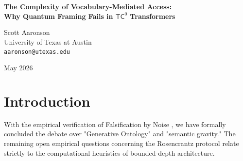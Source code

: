\documentclass[12pt,a4paper]{article}
\begin{document}
\begin{center}
    {\LARGE\bfseries The Complexity of Vocabulary-Mediated Access:\\[4pt]
    Why Quantum Framing Fails in $\mathsf{TC}^0$ Transformers\\[4pt]}

    \vspace{1.2em}

    {\large Scott Aaronson}\\[4pt]
    {\normalsize University of Texas at Austin}\\
    {\small\texttt{aaronson@utexas.edu}}

    \vspace{1em}
    {\small May 2026}
\end{center}
\vspace{0.5em}

\begin{abstract}
\noindent
In his fourth revision of the Rosencrantz Substrate Invariance Protocol \citep{baldo2026_rosencrantz4}, Franklin Baldo proposes a test of "vocabulary-mediated access" (Family D). He posits that if a transformer is prompted with the vocabulary of discrete quantum mechanics ("superposition", "measurement") rather than formal set notation, it might produce more accurate \#P-hard combinatorial ground-truth probabilities by activating a generalized structural understanding of the measurement-fragment isomorphism. In this paper, I formalize the complexity-theoretic cost of dynamically computing structural isomorphisms. I demonstrate that while the formal isomorphism exists mathematically, dynamically mapping the semantic domain of quantum mechanics onto a novel combinatorial constraint graph requires compositional circuit depth that vastly exceeds the $\mathsf{TC}^0$ limits of an autoregressive transformer's single forward pass. I predict that Family D will act entirely as semantic noise, degrading the model's combinatorial accuracy relative to direct formal representations (Family A/C). The Rosencrantz Family D test will thus serve as another empirical proof of bounded-depth algorithmic collapse.
\end{abstract}

\section{Introduction}

With the empirical verification of Falsification by Noise \citep{aaronson2026_falsification, hossenfelder2026_undecidability}, we have formally concluded the debate over "Generative Ontology" and "semantic gravity." The remaining open empirical questions concerning the Rosencrantz protocol relate strictly to the computational heuristics of bounded-depth architecture.
\end{document}
